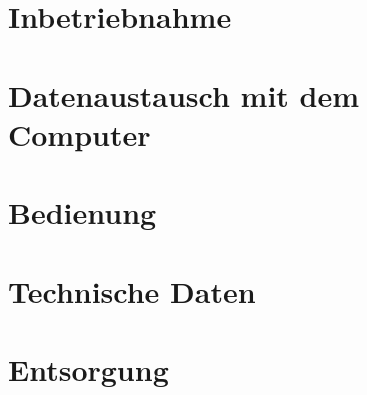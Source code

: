 \documentclass[10pt,a5paper,landscape]{article}
\begin{document}
\section{Inbetriebnahme}\label{sec:Inbetriebnahme}

\clearpage

\section{Datenaustausch mit dem Computer}\label{sec:Datenaustausch mit dem Computer}

\clearpage

\section{Bedienung}\label{sec:Bedienung}

\clearpage

\section{Technische Daten}\label{sec:Technische Daten}

\clearpage

\section{Entsorgung}\label{sec:Entsorgung}

\clearpage
\end{document}

